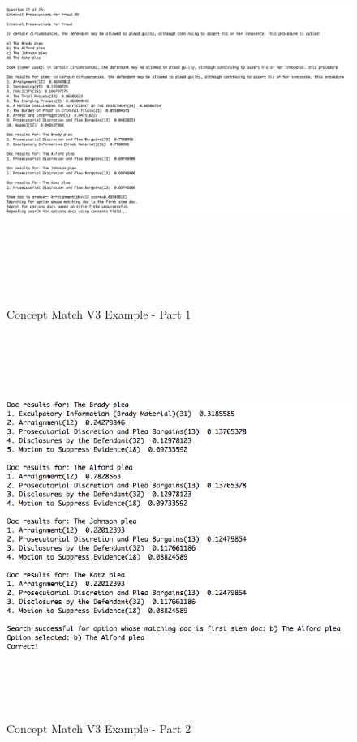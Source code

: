\begin{figure}
\centering
\vspace{0.75in}
\includegraphics[width=125mm, height=125mm]{concept_match_v3_example_part_1.png}
\caption{Concept Match V3 Example - Part 1}
\label{fig:concept_match_v3_example_part_1}
\end{figure}

\begin{figure}
\centering
\vspace{0.75in}
\includegraphics[width=125mm, height=125mm]{concept_match_v3_example_part_2.png}
\caption{Concept Match V3 Example - Part 2}
\label{fig:concept_match_v3_example_part_2}
\end{figure}

